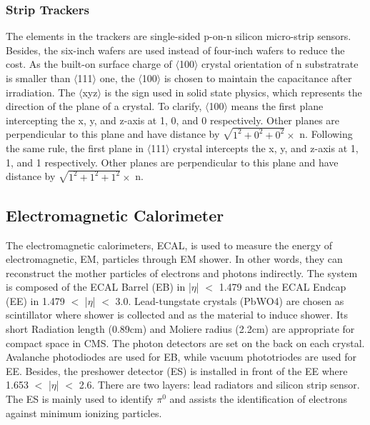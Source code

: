 \subsubsection{Strip Trackers}
The elements in the trackers are single-sided p-on-n silicon micro-strip sensors. 
Besides, the six-inch wafers are used instead of four-inch wafers to reduce the cost. 
As the built-on surface charge of $\langle$100$\rangle$ crystal orientation of n substratrate is smaller than $\langle$111$\rangle$ one, 
the $\langle$100$\rangle$ is chosen to maintain the capacitance after irradiation. The $\langle$xyz$\rangle$ is the sign used in solid state physics, which represents the direction of the plane of a crystal. To clarify, $\langle$100$\rangle$ means the first plane intercepting the x, y, and z-axis at 1, 0, and 0 respectively. Other planes are perpendicular to this plane and have distance by $\sqrt{1^2+0^2+0^2} \times$ n. Following the same rule, the first plane in $\langle$111$\rangle$ crystal intercepts the x, y, and z-axis at 1, 1, and 1 respectively. Other planes are perpendicular to this plane and have distance by $\sqrt{1^2+1^2+1^2} \times$ n.

\subsection{Electromagnetic Calorimeter} 
The electromagnetic calorimeters, ECAL, is used to measure the energy of electromagnetic, EM, particles through EM shower. 
In other words, they can reconstruct the mother particles of electrons and photons indirectly.
The system is composed of the ECAL Barrel (EB) in |$\eta $| $<$ 1.479 and the ECAL Endcap (EE) in 1.479 $<$ |$\eta $| $<$ 3.0. 
Lead-tungstate crystals (PbWO4) are chosen as scintillator where shower is collected and as the material to induce shower.
Its short Radiation length (0.89cm) and Moliere radius (2.2cm) are appropriate for compact space in CMS.
The photon detectors are set on the back on each crystal. 
Avalanche photodiodes are used for EB, while vacuum phototriodes are used for EE. 
Besides, the preshower detector (ES) is installed in front of the EE where 1.653 $<$ |$\eta $| $<$ 2.6. 
There are two layers: lead radiators and silicon strip sensor.
The ES is mainly used to identify $\pi ^0$ and assists the identification of electrons against minimum ionizing particles.
 

